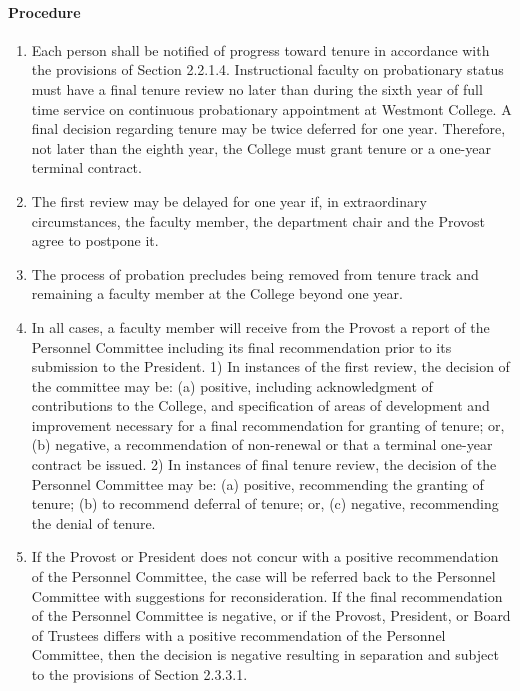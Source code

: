 \documentclass[letterpaper, 11pt]{article}
\begin{document}
			\paragraph{Procedure}
				\begin{enumerate}[label=\alph*)]
					\item{Each person shall be notified of progress toward tenure in accordance with the provisions of Section 2.2.1.4.  Instructional faculty on probationary status must have a final tenure review no later than during the sixth year of full time service on continuous probationary appointment at Westmont College.  A final decision regarding tenure may be twice deferred for one year.  Therefore, not later than the eighth year, the College must grant tenure or a one-year terminal contract.}
					\item{The first review may be delayed for one year if, in extraordinary circumstances, the faculty member, the department chair and the Provost agree to postpone it.}
					\item{The process of probation precludes being removed from tenure track and remaining a faculty member at the College beyond one year.}
					\item{In all cases, a faculty member will receive from the Provost a report of the Personnel Committee including its final recommendation prior to its submission to the President.}
					1) In instances of the first review, the decision of the committee may be:
					(a) positive, including acknowledgment of contributions to the College, and specification of areas of development and improvement necessary for a final recommendation for granting of tenure; or,
					(b) negative, a recommendation of non-renewal or that a terminal one-year contract be issued.
					2) In instances of final tenure review, the decision of the Personnel Committee may be:
					(a) positive, recommending the granting of tenure;
					(b) to recommend deferral of tenure; or,
					(c) negative, recommending the denial of tenure.
					\item{If the Provost or President does not concur with a positive recommendation of the Personnel Committee, the case will be referred back to the Personnel Committee with suggestions for reconsideration.  If the final recommendation of the Personnel Committee is negative, or if the Provost, President, or Board of Trustees differs with a positive recommendation of the Personnel Committee, then the decision is negative resulting in separation and subject to the provisions of Section 2.3.3.1.}
				\end{enumerate}
\end{document}
